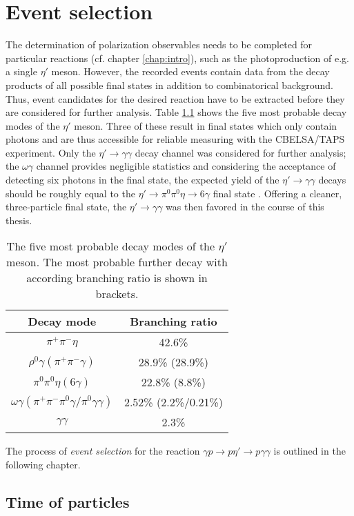 \chapter{Event selection}
The determination of polarization observables needs to be completed for particular reactions (cf. chapter \ref{chap:intro}), such as the photoproduction of e.g. a single $\eta'$ meson. However, the recorded events  contain data from the decay products of all possible final states in addition to combinatorical background. Thus, event candidates for the desired reaction have to be extracted before they are considered for further analysis. Table \ref{tab:etap} shows the five most probable decay modes of the $\eta'$ meson. Three of these result in final states which only contain photons and are thus accessible for reliable measuring with the CBELSA/TAPS experiment. Only the $\eta'\to\gamma\gamma$ decay channel was considered for further analysis; the $\omega\gamma$ channel provides negligible statistics and considering the acceptance of detecting six photons in the final state, the expected yield of the $\eta'\to\gamma\gamma$ decays should be roughly equal to the $\eta'\to\pi^0\pi^0\eta\to6\gamma$ final state \cite{farah}. Offering a cleaner, three-particle final state, the $\eta'\to\gamma\gamma$ was then favored in the course of this thesis.      
\begin{table}[htbp]
	\centering
	\begin{tabular}{cc}
		\toprule
		Decay mode&Branching ratio\\
		\hline
		$\pi^+\pi^-\eta$&42.6\%\\
		$\rho^0\gamma(\pi^+\pi^-\gamma)$ &28.9\% (28.9\%)\\
	$\pi^0\pi^0\eta(6\gamma)$ & 22.8\% (8.8\%)\\
		$\omega\gamma (\pi^+\pi^-\pi^0\gamma/\pi^0\gamma\gamma)$&2.52\% (2.2\%/0.21\%)\\
	$\gamma\gamma$&2.3\%\\

		\bottomrule
	\end{tabular}
\caption{The five most probable decay modes of the $\eta'$ meson. The most probable further decay with according branching ratio is shown in brackets.\cite{pdg}}
\label{tab:etap}
\end{table}



The process of \emph{event selection} for the reaction $\gamma p \to p\eta'\to p\gamma\gamma$ is outlined in the following chapter.

    

\section{Time of particles}